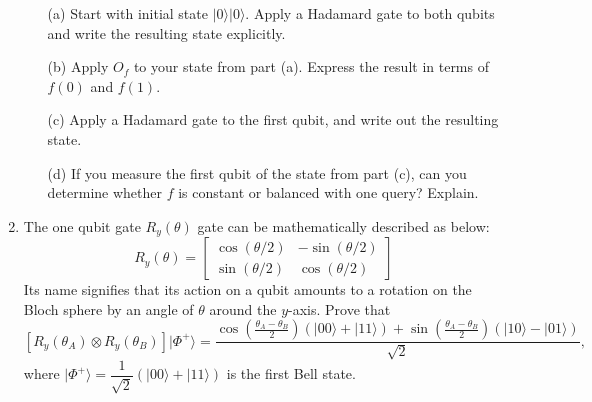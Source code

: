 \documentclass[12pt]{article}
\begin{document}
\begin{enumerate}
\begin{enumerate}
    \item[(a)] Start with initial state $|0\rangle|0\rangle$. Apply a Hadamard gate to both qubits and write the resulting state explicitly.
    \item[(b)] Apply $O_f$ to your state from part (a). 
    Express the result in terms of $f(0)$ and $f(1)$.
    \item[(c)] Apply a Hadamard gate to the first qubit, and write out the resulting state. 
    \item[(d)] If you measure the first qubit of the state from part (c), can you determine whether $f$ is constant or balanced with one query? Explain. 
\end{enumerate}
\item The one qubit gate $R_y(\theta)$ gate can be mathematically described as below:
$$R_y(\theta)=\begin{bmatrix}
\cos(\theta/2) &  -\sin (\theta/2)\\
\sin(\theta/2) & \cos (\theta/2)
\end{bmatrix}$$
Its name signifies that its action on a qubit amounts to a rotation on the Bloch sphere by an angle of $\theta$ around the $y$-axis. 
Prove that 
$$[R_y(\theta_A) \otimes R_y(\theta_B)]|\Phi^+\rangle=\dfrac{\cos\left(\frac{\theta_A-\theta_B}{2}\right)\left(|00\rangle +|11\rangle \right) + \sin\left(\frac{\theta_A-\theta_B}{2}\right) \left( |10\rangle - |01\rangle \right)}{\sqrt{2}},$$
where $|\Phi^+\rangle=\dfrac{1}{\sqrt{2}}\left(|00\rangle+|11\rangle\right)$ is the first Bell state. 
\end{enumerate}
\end{document}
